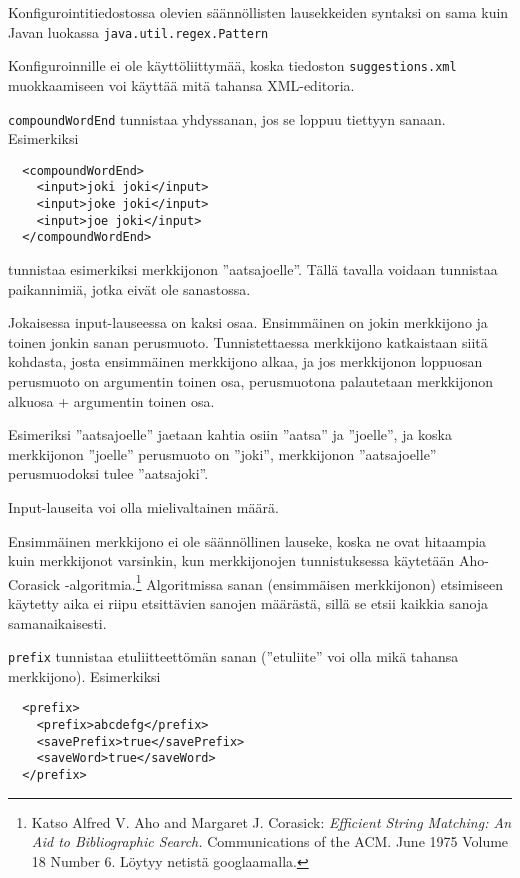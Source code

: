 \documentclass[12pt]{article}
\begin{document}
Konfigurointitiedostossa olevien säännöllisten lausekkeiden syntaksi on
sama kuin Javan luokassa \verb=java.util.regex.Pattern=

Konfiguroinnille ei ole käyttöliittymää, koska tiedoston
\verb=suggestions.xml= muokkaamiseen voi käyttää mitä tahansa
XML-editoria.




\bigskip
\verb|compoundWordEnd| tunnistaa yhdyssanan, jos se loppuu tiettyyn sanaan.
Esimerkiksi

\begin{verbatim}
  <compoundWordEnd>
    <input>joki joki</input>
    <input>joke joki</input>
    <input>joe joki</input>
  </compoundWordEnd>
\end{verbatim}

tunnistaa esimerkiksi merkkijonon ''aatsajoelle''. Tällä tavalla
voidaan tunnistaa paikannimiä, jotka eivät ole sanastossa.

Jokaisessa input-lauseessa on kaksi osaa. Ensimmäinen on jokin
merkkijono ja toinen jonkin sanan perusmuoto. Tunnistettaessa
merkkijono katkaistaan siitä kohdasta, josta ensimmäinen merkkijono
alkaa, ja jos merkkijonon loppuosan perusmuoto on argumentin toinen
osa, perusmuotona palautetaan merkkijonon alkuosa + argumentin toinen
osa.

Esimeriksi ''aatsajoelle'' jaetaan kahtia osiin ''aatsa'' ja
''joelle'', ja koska merkkijonon ''joelle'' perusmuoto on ''joki'',
merkkijonon ''aatsajoelle'' perusmuodoksi tulee ''aatsajoki''.

Input-lauseita voi olla mielivaltainen määrä.

Ensimmäinen merkkijono ei ole säännöllinen lauseke, koska ne ovat
hitaampia kuin merkkijonot varsinkin, kun merkkijonojen tunnistuksessa
käytetään Aho-Corasick -algoritmia.\footnote{Katso
Alfred V. Aho and Margaret J. Corasick:
\emph{Efficient String Matching: An Aid to Bibliographic Search.}
Communications of the ACM. June 1975 Volume 18 Number 6.
Löytyy netistä googlaamalla.} Algoritmissa sanan (ensimmäisen
merkkijonon) etsimiseen käytetty aika ei riipu etsittävien sanojen
määrästä, sillä se etsii kaikkia sanoja samanaikaisesti.



\bigskip
\verb|prefix| tunnistaa etuliitteettömän sanan (''etuliite'' voi olla
mikä tahansa merkkijono). Esimerkiksi

\begin{verbatim}
  <prefix>
    <prefix>abcdefg</prefix>
    <savePrefix>true</savePrefix>
    <saveWord>true</saveWord>
  </prefix>
\end{verbatim}
\end{document}
